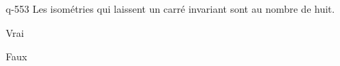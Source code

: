 \begin{truefalse}{q-553}
Les isométries qui laissent un carré invariant sont au nombre de huit.
\item* Vrai
\item Faux
\end{truefalse}

